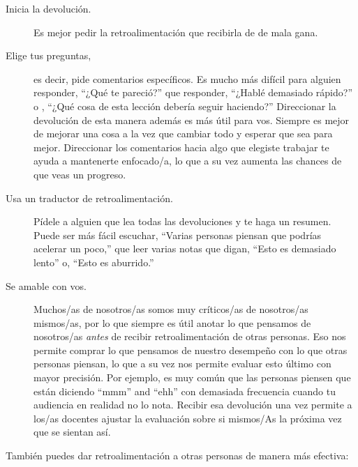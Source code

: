 \begin{description}

\item[Inicia la devolución.]
  Es mejor pedir la retroalimentación que recibirla de de mala gana.

\item[Elige tus preguntas,]
  es decir, pide comentarios específicos.
  Es mucho más difícil para alguien responder,
  ``¿Qué te pareció?''
  que responder,
  ``¿Hablé demasiado rápido?''
  o ,
  ``¿Qué cosa de esta lección debería seguir haciendo?''
  Direccionar la devolución de esta manera además es más útil para vos.
  Siempre es mejor de mejorar una cosa a la vez
  que cambiar todo y esperar que sea para mejor.
  Direccionar los comentarios hacia algo que elegiste trabajar te ayuda a mantenerte enfocado/a,
  lo que a su vez aumenta las chances de que veas un progreso.

\item[Usa un traductor de retroalimentación.]
  Pídele a alguien que lea todas las devoluciones y te haga un resumen.
  Puede ser más fácil escuchar,
  ``Varias personas piensan que podrías acelerar un poco,''
  que leer varias notas que digan, ``Esto es demasiado lento''
  o, ``Esto es aburrido.''

\item[Se amable con vos.]
  Muchos/as de nosotros/as somos muy críticos/as de nosotros/as mismos/as,
  por lo que siempre es útil anotar lo que pensamos de nosotros/as
  \emph{antes} de recibir retroalimentación de otras personas.
  Eso nos permite comprar lo que pensamos de nuestro desempeño
  con lo que otras personas piensan,
  lo que a su vez nos permite evaluar esto último con mayor precisión.
  Por ejemplo,
  es muy común que las personas piensen que están diciendo ``mmm'' and ``ehh'' con demasiada frecuencia
  cuando tu audiencia en realidad no lo nota.
  Recibir esa devolución una vez permite a los/as docentes ajustar la evaluación sobre si mismos/As la próxima vez que se sientan así.

\end{description}

\noindent
También puedes dar retroalimentación a otras personas de manera más efectiva:

